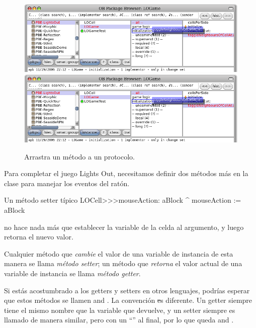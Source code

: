 \documentclass[a4paper,10pt,twoside]{book}
\begin{document}
\begin{figure}[htbp]
   \centering
   \ifluluelse
		{\includegraphics[width=\textwidth]{DragMethod} }
		{\includegraphics[scale=0.7]{DragMethod} }
   \caption{Arrastra un m\'etodo a un protocolo.}
\end{figure}

Para completar el juego Lights Out, necesitamos definir dos m\'etodos m\'as en la clase  para manejar los eventos del rat\'on.

\begin{method}[mouseAction:]{Un m\'etodo setter t\'ipico}
LOCell>>>mouseAction: aBlock
   ^ mouseAction := aBlock
\end{method}

 no hace nada m\'as que establecer la variable  de la celda al argumento, y luego retorna el nuevo valor.

Cualquier m\'etodo que \emph{cambie} el valor de una variable de instancia de esta manera se llama \emph{m\'etodo setter}; un m\'etodo que \emph{retorna} el valor actual de una variable de instancia se llama \emph{m\'etodo getter}.

Si est\'as acostumbrado a los getters y setters en otros lenguajes, podr\'ias esperar que estos m\'etodos se  llamen  and .
La convenci\'on \st es diferente. 
Un getter siempre tiene el mismo nombre que la variable que devuelve, y un setter siempre es llamado de manera similar, pero con un ``\ct{:}'' al final, por lo que queda  and .
\end{document}
